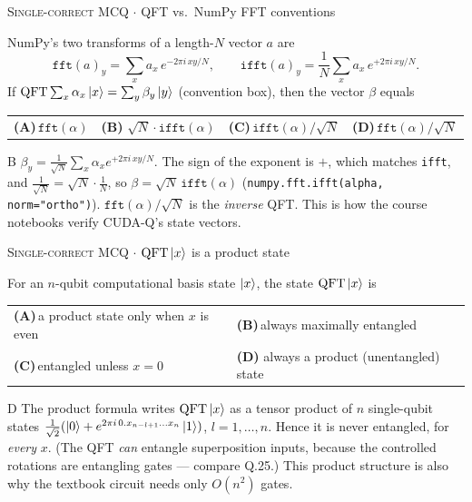 \documentclass[11pt,a4paper]{article}
\newcommand{\optlabel}[1]{\textbf{(#1)}}
\newcommand{\correctlabel}[1]{\textcolor{okgreen}{\textbf{(#1)}\,\ding{51}}}
\newenvironment{qitem}[1]{\begin{list}{}{\setlength{\leftmargin}{3.3em}\setlength{\labelwidth}{3.1em}%
  \setlength{\labelsep}{0.2em}\setlength{\topsep}{3pt}\setlength{\parsep}{3pt}}\item[\textbf{Q.#1}\hfill]}{\end{list}}
\newcommand{\qsep}{\par\vspace{2pt}{\color{black!15}\hrule}\vspace{4pt}}
\newcommand{\qmeta}[2]{{\footnotesize\color{black!60}\textsc{#1} \;$\cdot$\; #2}\par}
\begin{document}
\begin{qitem}{53}
\qmeta{Single-correct MCQ}{QFT vs.\ NumPy FFT conventions}
NumPy's two transforms of a length-$N$ vector $a$ are
\[ \texttt{fft}(a)_y = \sum_x a_x\, e^{-2\pi i\,xy/N}, \qquad \texttt{ifft}(a)_y = \frac1N\sum_x a_x\, e^{+2\pi i\,xy/N}. \]
If $\mathrm{QFT}\sum_x\alpha_x\ket x = \sum_y\beta_y\ket y$ (convention box), then the vector $\beta$ equals
\par\smallskip\noindent\begin{tabularx}{\linewidth}{@{}*{4}{L}@{}}
\optlabel{A}\,$\texttt{fft}(\alpha)$ & \correctlabel{B}\,$\sqrt N\cdot\texttt{ifft}(\alpha)$ & \optlabel{C}\,$\texttt{ifft}(\alpha)/\sqrt N$ & \optlabel{D}\,$\texttt{fft}(\alpha)/\sqrt N$
\end{tabularx}
\end{qitem}
\begin{solbox}{B}
$\beta_y = \frac{1}{\sqrt N}\sum_x\alpha_x e^{+2\pi i\,xy/N}$. The sign of the exponent is $+$, which matches \texttt{ifft}, and
$\frac{1}{\sqrt N} = \sqrt N\cdot\frac1N$, so $\beta = \sqrt N\,\texttt{ifft}(\alpha)$ (\texttt{numpy.fft.ifft(alpha, norm="ortho")}).
$\texttt{fft}(\alpha)/\sqrt N$ is the \emph{inverse} QFT. This is how the course notebooks verify CUDA-Q's state vectors.
\end{solbox}
\qsep

\begin{qitem}{54}
\qmeta{Single-correct MCQ}{$\mathrm{QFT}\ket{x}$ is a product state}
For an $n$-qubit computational basis state $\ket x$, the state $\mathrm{QFT}\ket x$ is
\par\smallskip\noindent\begin{tabularx}{\linewidth}{@{}*{2}{L}@{}}
\optlabel{A}\,a product state only when $x$ is even & \optlabel{B}\,always maximally entangled \\[3pt]
\optlabel{C}\,entangled unless $x = 0$ & \correctlabel{D}\,always a product (unentangled) state
\end{tabularx}
\end{qitem}
\begin{solbox}{D}
The product formula writes $\mathrm{QFT}\ket{x}$ as a tensor product of $n$ single-qubit states
$\frac{1}{\sqrt2}(\ket0 + e^{2\pi i\,0.x_{n-l+1}\dots x_n}\ket1)$, $l = 1, \dots, n$. Hence it is never entangled,
for \emph{every} $x$. (The QFT \emph{can} entangle superposition inputs, because the controlled rotations are entangling
gates --- compare Q.25.) This product structure is also why the textbook circuit needs only $O(n^2)$ gates.
\end{solbox}
\qsep
\end{document}
